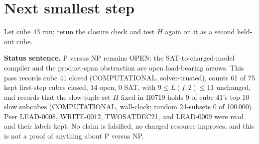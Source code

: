 \documentclass[11pt]{article}
\begin{document}
\section*{Next smallest step}
Let cube 43 run; rerun the closure check and test $H$ again on it as a second held-out cube.

\bigskip
\noindent\textbf{Status sentence.} P versus NP remains OPEN: the SAT-to-charged-model compiler and the product-span obstruction are open load-bearing arrows. This pass records cube 41 closed (COMPUTATIONAL, solver-trusted), counts 61 of 75 kept first-step cubes closed, 14 open, 0 SAT, with $9\le L(f,2)\le 11$ unchanged, and records that the slow-tuple set $H$ fixed in H0719 holds 9 of cube 41's top-10 slow subcubes (COMPUTATIONAL, wall-clock; random 24-subsets 0 of 100\,000). Peer LEAD-0008, WRITE-0012, TWOSATDEC21, and LEAD-0009 were read and their labels kept. No claim is falsified, no charged resource improves, and this is not a proof of anything about P versus NP.
\end{document}
